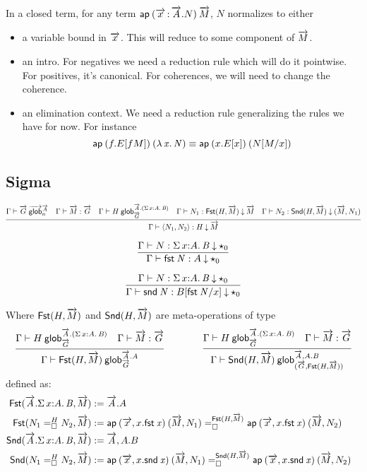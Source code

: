 In a closed term, for any term $\ap{(\teltm xA.N)}{\tel M}$, $N$ normalizes
to either
\begin{itemize}
\item a variable bound in $\tel{x}$. This will reduce to some component of
$\tel{M}$.
\item an intro. For negatives we need a reduction rule which will do it
pointwise. For positives, it’s canonical. For coherences, we will need to change
the coherence.
\item an elimination context. We need a reduction rule generalizing the rules we
have for now. For instance
\[\ap{(f.E[f M])}{(\ulam{x}{N})} \equiv \ap{(x.E[x])}{(\subst{N}{M}{x})}\]
\end{itemize}


\subsection{Sigma}

\begin{small}\[
\infer
  {\ofdepglob{\Gamma}{\pair{N_1}{N_2}}{H}{\tel M}}
  {\wfglob{\Gamma}{\tel G}{\tel A}n
  &\ofglob{\Gamma}{\tel M}{\tel G}
  &\wfdepglob{\Gamma}{H}{\tel A.(\sigmacl xAB)}{\tel G}
  &\ofdepglob{\Gamma}{N_1}{\Fstsigma H{\tel M}}{\tel M}
  &\ofdepglob{\Gamma}{N_2}{\Sndsigma H{\tel M}}{(\tel M,N_1)}}
\]\end{small}
\[
\infer
  {\ofdepglob{\Gamma}{\fst N}{A}{\unitglobelt 0}}
  {\ofdepglob{\Gamma}{N}{\sigmacl xAB}{\unitglobelt 0}}
\]

\[
\infer
  {\ofdepglob{\Gamma}{\snd N}{B[\fst N/x]}{\unitglobelt 0}}
  {\ofdepglob{\Gamma}{N}{\sigmacl xAB}{\unitglobelt 0}}
\]

Where $\Fstsigma H{\tel M}$ and $\Sndsigma H{\tel M}$ are meta-operations of type
\[
\infer
  {\wfdepglob{\Gamma}{\Fstsigma H{\tel M}}{\tel A.A}{\tel G}}
  {\wfdepglob{\Gamma}{H}{\tel A.(\sigmacl xAB)}{\tel G}
  &\ofglob{\Gamma}{\tel M}{\tel G}}
\qquad\qquad
\infer
  {\wfdepglob{\Gamma}{\Sndsigma H{\tel M}}{\tel A,A.B}{(\tel G,\Fstsigma H{\tel M})}}
  {\wfdepglob{\Gamma}{H}{\tel A.(\sigmacl xAB)}{\tel G}
  &\ofglob{\Gamma}{\tel M}{\tel G}}
\]
defined as:
\[\begin{aligned}
\Fstsigma{\tel A.\sigmacl xAB}{\tel M} &:= \tel A.A \\
\Fstsigma{\dhomj{H}{N_1}{N_2}{\blank}}{\tel M} &:=
\dhomj{\Fstsigma H{\tel M}}{\ap{(\tel x,x.\fst x)}{(\tel M,N_1)}}{\ap{(\tel
x,x.\fst x)}{(\tel M,N_2)}}{\blank}
&\\
\Sndsigma{\tel A.\sigmacl xAB}{\tel M} &:= \tel A,A.B \\
\Sndsigma{\dhomj{H}{N_1}{N_2}{\blank}}{\tel M} &:=
\dhomj{\Sndsigma H{\tel M}}{\ap{(\tel x,x.\snd x)}{(\tel M,N_1)}}{\ap{(\tel
x,x.\snd x)}{(\tel M,N_2)}}{\blank}
\end{aligned}\]

